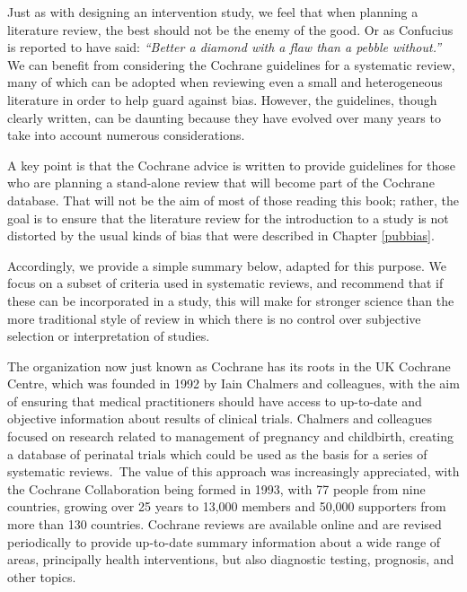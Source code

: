 \documentclass{krantz}
\begin{document}
Just as with designing an intervention study, we feel that when planning a literature review, the best should not be the enemy of the good. Or as Confucius is reported to have said: \emph{``Better a diamond with a flaw than a pebble without.''} We can benefit from considering the Cochrane guidelines for a systematic review, many of which can be adopted when reviewing even a small and heterogeneous literature in order to help guard against bias. However, the guidelines, though clearly written, can be daunting because they have evolved over many years to take into account numerous considerations.

A key point is that the Cochrane advice is written to provide guidelines for those who are planning a stand-alone review that will become part of the Cochrane database. That will not be the aim of most of those reading this book; rather, the goal is to ensure that the literature review for the introduction to a study is not distorted by the usual kinds of bias that were described in Chapter \ref{pubbias}.

Accordingly, we provide a simple summary below, adapted for this purpose. We focus on a subset of criteria used in systematic reviews, and recommend that if these can be incorporated in a study, this will make for stronger science than the more traditional style of review in which there is no control over subjective selection or interpretation of studies.

\begin{tcolorbox}[colback=Black!5!lightgray,colframe=black!75!black,coltitle=white,title=History of Cochrane]\label{box:Cochrane}
The organization now just known as Cochrane has its roots in the UK Cochrane Centre, which was founded in 1992 by Iain Chalmers and colleagues, with the aim of ensuring that medical practitioners should have access to up-to-date and objective information about results of clinical trials. Chalmers and colleagues focused on research related to management of pregnancy and childbirth, creating a database of perinatal trials which could be used as the basis for a series of systematic reviews.\
The value of this approach was increasingly appreciated, with the Cochrane Collaboration being formed in 1993, with 77 people from nine countries, growing over 25 years to 13,000 members and 50,000 supporters from more than 130 countries. Cochrane reviews are available online and are revised periodically to provide up-to-date summary information about a wide range of areas, principally health interventions, but also diagnostic testing, prognosis, and other topics.

\end{tcolorbox}
\end{document}

